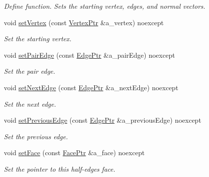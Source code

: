 \begin{DoxyCompactItemize}
\begin{DoxyCompactList}\small\item\em Define function. Sets the starting vertex, edges, and normal vectors. \end{DoxyCompactList}\item 
void \hyperlink{classDcel_1_1EdgeT_a2611a8e0ae581ab8822f677d6d69edbd}{set\+Vertex} (const \hyperlink{classDcel_1_1EdgeT_ab4ba57cfc6b2f90da43096eea87bb284}{Vertex\+Ptr} \&a\+\_\+vertex) noexcept
\begin{DoxyCompactList}\small\item\em Set the starting vertex. \end{DoxyCompactList}\item 
void \hyperlink{classDcel_1_1EdgeT_ab9ef2366cf1d411444caf81d5159a3e1}{set\+Pair\+Edge} (const \hyperlink{classDcel_1_1EdgeT_af525f4228d820f6b8b23fc02d937e4c8}{Edge\+Ptr} \&a\+\_\+pair\+Edge) noexcept
\begin{DoxyCompactList}\small\item\em Set the pair edge. \end{DoxyCompactList}\item 
void \hyperlink{classDcel_1_1EdgeT_aeeda5324a62f1d8b6e50d788907526bf}{set\+Next\+Edge} (const \hyperlink{classDcel_1_1EdgeT_af525f4228d820f6b8b23fc02d937e4c8}{Edge\+Ptr} \&a\+\_\+next\+Edge) noexcept
\begin{DoxyCompactList}\small\item\em Set the next edge. \end{DoxyCompactList}\item 
void \hyperlink{classDcel_1_1EdgeT_af5aa7f27fe95ba4331259b4de927bb37}{set\+Previous\+Edge} (const \hyperlink{classDcel_1_1EdgeT_af525f4228d820f6b8b23fc02d937e4c8}{Edge\+Ptr} \&a\+\_\+previous\+Edge) noexcept
\begin{DoxyCompactList}\small\item\em Set the previous edge. \end{DoxyCompactList}\item 
\mbox{\label{classDcel_1_1EdgeT_adb65dd99901ed730354b17c59e46e1fb}} 
void \hyperlink{classDcel_1_1EdgeT_adb65dd99901ed730354b17c59e46e1fb}{set\+Face} (const \hyperlink{classDcel_1_1EdgeT_a97dd9849ea4a21223095f852e48e36e8}{Face\+Ptr} \&a\+\_\+face) noexcept
\begin{DoxyCompactList}\small\item\em Set the pointer to this half-\/edge\textquotesingle{}s face. \end{DoxyCompactList}\item 

\end{DoxyCompactItemize}
